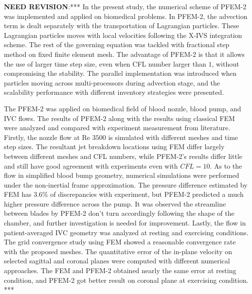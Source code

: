 \textbf{NEED REVISION}:*** In the present study, the numerical scheme of PFEM-2 was implemented and applied on biomedical problems. In PFEM-2, the advection term is dealt separately with the transportation of Lagrangian particles. These Lagrangian particles moves with local velocities following the X-IVS integration scheme. The rest of the governing equation was tackled with fractional step method on fixed finite element mesh. The advantage of PFEM-2 is that it allows the use of larger time step size, even when CFL number larger than $1$, without compromising the stability. The parallel implementation was introduced when particles moving across multi-processors during advection stage, and the scalability performance with different inventory strategies were presented. 

The PFEM-2 was applied on biomedical field of blood nozzle, blood pump, and IVC flows. The results of PFEM-2 along with the results using classical FEM were analyzed and compared with experiment measurement from literature. Firstly, the nozzle flow at Re $3500$ is simulated with different meshes and time step sizes. The resultant jet breakdown locations using FEM differ largely between different meshes and CFL numbers, while PFEM-2's results differ little and still have good agreement with experiments even with $CFL=10$. As to the flow in simplified blood bump geometry, numerical simulations were performed under the non-inertial frame approximation. The pressure difference estimated by FEM has $3.6$\% of discrepancies with experiment, but PFEM-2 predicted a much higher pressure difference across the pump. It was observed the streamline between blades by PFEM-2 don't turn accordingly following the shape of the chamber, and further investigation is needed for improvement. Lastly, the flow in patient-averaged IVC geometry was analyzed at resting and exercising conditions. The grid convergence study using FEM showed a reasonable convergence rate with the proposed meshes. The quantitative error of the in-plane velocity on selected sagittal and coronal planes were computed with different numerical approaches. The FEM and PFEM-2 obtained nearly the same error at resting condition, and PFEM-2 got better result on coronal plane at exercising condition.
***
